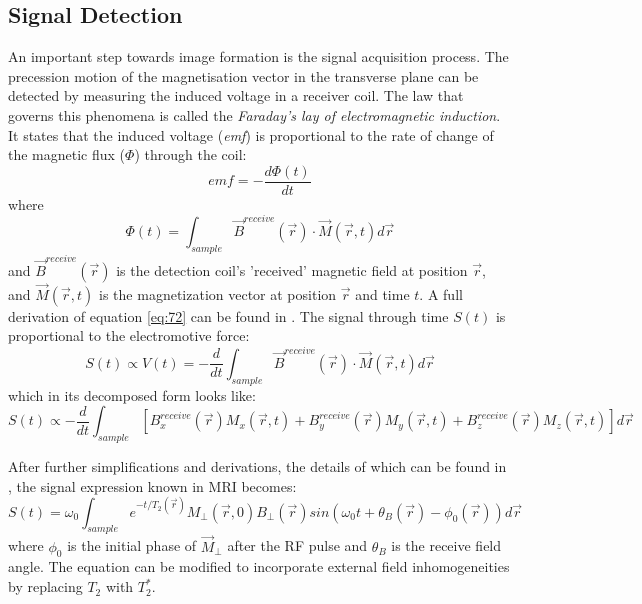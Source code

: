 \subsection{Signal Detection}

An important step towards image formation is the signal acquisition process. 
The precession motion of the magnetisation vector in the transverse plane can be detected by measuring the induced voltage in a receiver coil. 
The law that governs this phenomena is called the \textit{Faraday's lay of electromagnetic induction}.
It states that the induced voltage (\textit{emf}) is proportional to the rate of change of the magnetic flux ($\Phi$) through the coil:
\begin{equation} \label{eq:71}
    emf = - \frac{d \Phi(t)}{dt}
\end{equation}
where 
\begin{equation}\label{eq:72}
    \Phi(t) = \int_{sample} \vec{B}^{receive}(\vec{r}) \cdot \vec{M}(\vec{r}, t) d\vec{r}
\end{equation}
and $\vec{B}^{receive}(\vec{r})$ is the detection coil's 'received' magnetic field at position $\vec{r}$, and $\vec{M}(\vec{r}, t)$ is the magnetization vector at position $\vec{r}$ and time $t$.
A full derivation of equation \ref{eq:72} can be found in \cite{Haacke1999}. 
The signal through time $S(t)$ is proportional to the electromotive force:
\begin{equation}\label{eq:714}
    S(t) \propto V(t) = - \frac{d }{d t} \int_{sample} \vec{B}^{receive}(\vec{r}) \cdot \vec{M}(\vec{r}, t) d\vec{r}
\end{equation}
which in its decomposed form looks like:
\begin{equation}
    S(t) \propto - \frac{d}{dt} 
    \int_{sample}
          [B_x^{receive} (\vec{r}) M_x (\vec{r}, t) + 
          B_y^{receive} (\vec{r}) M_y (\vec{r}, t) + 
          B_z^{receive} (\vec{r}) M_z (\vec{r}, t)]  d\vec{r}
\end{equation}

After further simplifications and derivations, the details of which can be found in \cite{Haacke1999}, the signal expression known in MRI becomes:
\begin{equation}
    S(t) =
        \omega_0 \int_{sample} e^{-t/T_2(\vec{r})} M_{\perp}(\vec{r},0) 
            B_{\perp}(\vec{r}) sin(\omega_0 t + \theta_B(\vec{r}) - \phi_0(\vec{r})) d\vec{r}
\end{equation}
where $\phi_0$ is the initial phase of $\vec{M}_{\perp}$ after the RF pulse 
and $\theta_B$ is the receive field angle.
The equation can be modified to incorporate external field inhomogeneities by replacing $T_2$ with $T_2^*$.

